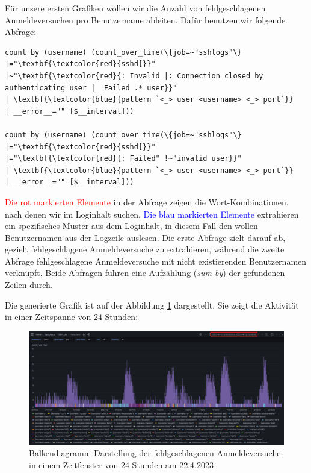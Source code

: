 Für unsere ersten Grafiken wollen wir die Anzahl von fehlgeschlagenen Anmeldeversuchen pro Benutzername ableiten. Dafür benutzen wir folgende Abfrage:

{
\begin{Verbatim}[fontsize=\small,commandchars=\\\{\},frame=single]
count by (username) (count_over_time(\{job=~"sshlogs"\} 
|="\textbf{\textcolor{red}{sshd[}}"
|~"\textbf{\textcolor{red}{: Invalid |: Connection closed by authenticating user |  Failed .* user}}"
| \textbf{\textcolor{blue}{pattern `<_> user <username> <_> port`}}
| __error__="" [$__interval]))

count by (username) (count_over_time(\{job=~"sshlogs"\}
|="\textbf{\textcolor{red}{sshd[}}"
|="\textbf{\textcolor{red}{: Failed" !~"invalid user}}"
| \textbf{\textcolor{blue}{pattern `<_> user <username> <_> port`}}
| __error__="" [$__interval]))
\end{Verbatim}
}

\textcolor{red}{Die rot markierten Elemente} in der Abfrage zeigen die Wort-Kombinationen, nach denen wir im Loginhalt suchen. \textcolor{blue}{Die blau markierten Elemente} extrahieren ein spezifisches Muster aus dem Loginhalt, in diesem Fall den wollen Benutzernamen aus der Logzeile auslesen. Die erste Abfrage zielt darauf ab, gezielt fehlgeschlagene Anmeldeversuche zu extrahieren, während die zweite Abfrage fehlgeschlagene Anmeldeversuche mit nicht existierenden Benutzernamen verknüpft. Beide Abfragen führen eine Aufzählung (\textit{sum by}) der gefundenen Zeilen durch.

Die generierte Grafik ist auf der Abbildung \ref{fig:2_Anmeldung_BenutzerName} dargestellt. Sie zeigt die Aktivität in einer Zeitspanne von 24 Stunden:

\newpage
{}
\thispagestyle{lscape}
\begin{landscape}
    \begin{figure}[H]
        \centerline{\includegraphics[width=1.5\textwidth]{assets/activityperhour.png}}
        \caption[Balkendiagramm Darstellung der fehlgeschlagenen Anmeldeversuche in einem Zeitfenster von 24 Stunden am ]
        {Balkendiagramm Darstellung der fehlgeschlagenen Anmeldeversuche in einem Zeitfenster von 24 Stunden am 22.4.2023}
        \label{fig:2_Anmeldung_BenutzerName}
        \centering
    \end{figure}
\end{landscape}
\restoregeometry

